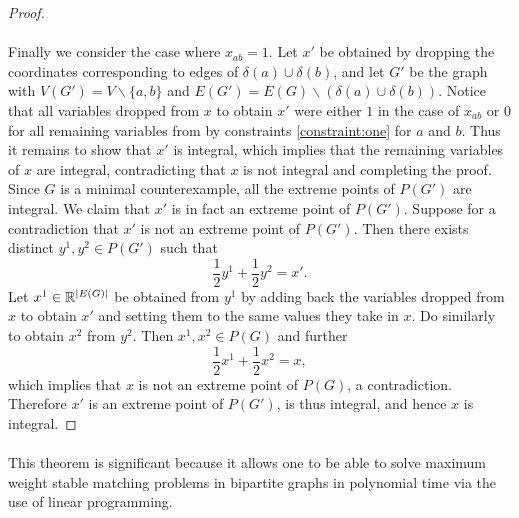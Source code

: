\begin{proof}
\paragraph{}
Finally we consider the case where $x_{ab} = 1$. Let $x'$ be obtained by dropping the coordinates corresponding to edges of $\delta(a) \cup \delta(b)$, and let $G'$ be the graph with $V(G') = V \backslash \{a,b\}$ and $E(G') = E(G) \backslash (\delta(a) \cup \delta(b))$. Notice that all variables dropped from $x$ to obtain $x'$ were either $1$ in the case of $x_{ab}$ or $0$ for all remaining variables from by constraints \ref{constraint:one} for $a$ and $b$. Thus it remains to show that $x'$ is integral, which implies that the remaining variables of $x$ are integral, contradicting that $x$ is not integral and completing the proof. Since $G$ is a minimal counterexample, all the extreme points of $P(G')$ are integral. We claim that $x'$ is in fact an extreme point of $P(G')$. Suppose for a contradiction that $x'$ is not an extreme point of $P(G')$. Then there exists distinct $y^1, y^2 \in P(G')$ such that
$$\frac{1}{2}y^1 + \frac{1}{2} y^2 = x'.$$
Let $x^1 \in \mathbb{R}^{\left|E(G)\right|}$ be obtained from $y^1$ by adding back the variables dropped from $x$ to obtain $x'$ and setting them to the same values they take in $x$. Do similarly to obtain $x^2$ from $y^2$. Then $x^1, x^2 \in P(G)$ and further
$$\frac{1}{2} x^1 + \frac{1}{2} x^2 = x,$$
which implies that $x$ is not an extreme point of $P(G)$, a contradiction. Therefore $x'$ is an extreme point of $P(G')$, is thus integral, and hence $x$ is integral. 
\end{proof}
\paragraph{}
This theorem is significant because it allows one to be able to solve maximum weight stable matching problems in bipartite graphs in polynomial time via the use of linear programming.